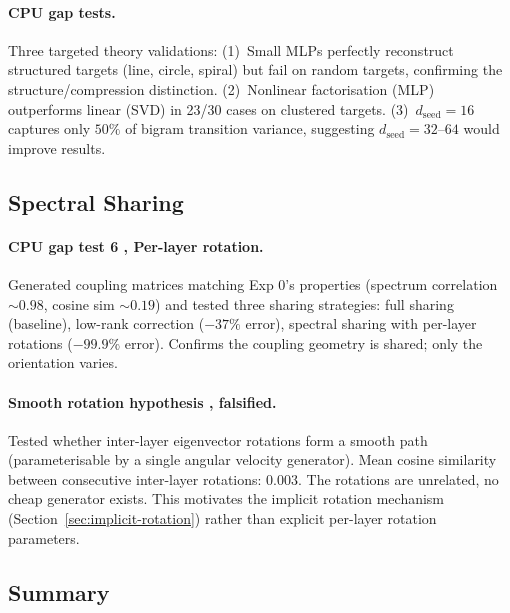 \documentclass[11pt, a4paper]{article}
\theoremstyle{remark}
\begin{document}
\paragraph{CPU gap tests.}
Three targeted theory validations:
(1)~Small MLPs perfectly reconstruct structured targets (line, circle, spiral) but fail on random targets, confirming the structure/compression distinction.
(2)~Nonlinear factorisation (MLP) outperforms linear (SVD) in 23/30 cases on clustered targets.
(3)~$d_{\text{seed}} = 16$ captures only $50\%$ of bigram transition variance, suggesting $d_{\text{seed}} = 32$--$64$ would improve results.

\subsection{Spectral Sharing}

\paragraph{CPU gap test 6 ,  Per-layer rotation.}
Generated coupling matrices matching Exp 0's properties (spectrum correlation ${\sim}0.98$, cosine sim ${\sim}0.19$) and tested three sharing strategies:
full sharing (baseline), low-rank correction ($-37\%$ error), spectral sharing with per-layer rotations ($-99.9\%$ error).
Confirms the coupling geometry is shared; only the orientation varies.

\paragraph{Smooth rotation hypothesis ,  falsified.}
Tested whether inter-layer eigenvector rotations form a smooth path (parameterisable by a single angular velocity generator).
Mean cosine similarity between consecutive inter-layer rotations: $0.003$.
The rotations are unrelated, no cheap generator exists.
This motivates the implicit rotation mechanism (Section~\ref{sec:implicit-rotation}) rather than explicit per-layer rotation parameters.

\subsection{Summary}
\end{document}
